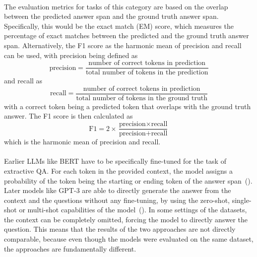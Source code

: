 \\
The evaluation metrics for tasks of this category are based on the overlap between the predicted answer span and the ground truth answer span.
Specifically, this would be the exact match (EM) score, which measures the percentage of exact matches between the predicted and the ground truth answer span.
Alternatively, the F1 score as the harmonic mean of precision and recall can be used, with precision being defined as
\[ \text{precision} = \frac{\text{number of correct tokens in prediction}}{\text{total number of tokens in the prediction}} \]
and recall as
\[ \text{recall} = \frac{\text{number of correct tokens in prediction}}{\text{total number of tokens in the ground truth}} \]
with a correct token being a predicted token that overlaps with the ground truth answer.
The F1 score is then calculated as
\[ \text{F1} = 2 \times \frac{\text{precision} \times \text{recall}}{\text{precision} + \text{recall}} \]
which is the harmonic mean of precision and recall.
\\\\
Earlier LLMs like BERT have to be specifically fine-tuned for the task of extractive QA.
For each token in the provided context, the model assigns a probability of the token being the starting or ending token of the answer span~(\cite{devlin:2018:BERT}).
\\
Later models like GPT-3 are able to directly generate the answer from the context and the questions without any fine-tuning, by using the zero-shot, single-shot or multi-shot capabilities of the model~(\cite{brown:2020:Language}).
In some settings of the datasets, the context can be completely omitted, forcing the model to directly answer the question.
This means that the results of the two approaches are not directly comparable, because even though the models were evaluated on the same dataset, the approaches are fundamentally different.

